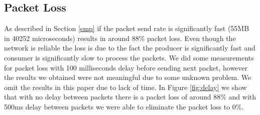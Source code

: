 \subsection{Packet Loss}
As described in Section \ref{smp} if the packet send rate is significantly fast (55MB in 40252 microseconds) results in around 88\% packet loss. Even though the network is reliable the loss is due to the fact the producer is significantly fast and consumer is significantly slow to process the packets. We did some measurements for packet loss with 100 milliseconds delay before sending next packet, however the results we obtained were not meaningful due to some unknown problem. We omit the results in this paper due to lack of time. In Figure \ref{fig:delay} we show that with no delay between packets there is a packet loss of around 88\% and with 500ms delay between packets we were able to eliminate the packet loss to 0\%.

